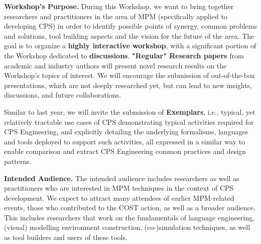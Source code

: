 \smallskip\noindent
\textbf{Workshop's Purpose.} During this Workshop, we want to bring together 
researchers and practitioners in the area of MPM (specifically applied to 
developing CPS) in order to identify possible points of synergy, common problems
and solutions, tool building aspects and the vision for the future of the area.
The goal is to organize a \textbf{highly interactive workshop}, with a significant 
portion of the Workshop dedicated to \textbf{discussions}.
\textbf{"Regular" Research papers} from academic and industry authors 
   will present novel research results on the Workshop's topics of interest. 
   We will encourage the submission of out-of-the-box presentations, which are 
   not deeply researched yet, but can lead to new insights, discussions, and 
   future collaborations.

Similar to last year, we will invite the submission of 
   \textbf{Exemplars}, i.e., typical, yet relatively tractable use cases of CPS 
   demonstrating typical activities required for CPS Engineering, and explicitly
   detailing the underlying formalisms, languages and tools deployed to support 
   such activities, all expressed in a similar way to enable comparison and 
   extract CPS Engineering common practices and design patterns.




\smallskip
\noindent
\textbf{Intended Audience.}
%
The intended audience includes researchers as well as practitioners who are 
interested in MPM techniques in the context of CPS development.
We expect to attract many attendees of earlier MPM-related events, those who 
contributed to the COST action, as well as a broader audience.
This includes researchers that work on the fundamentals of language 
engineering, (visual) modelling environment construction, (co-)simulation 
techniques, as well as tool builders and users of these tools.



